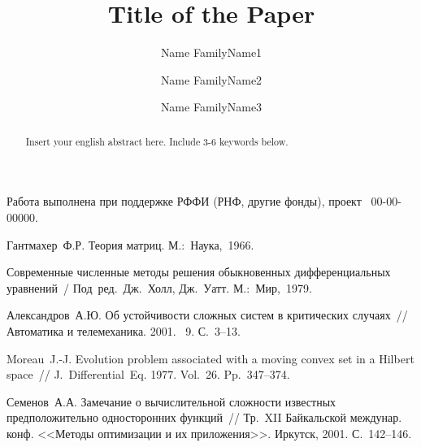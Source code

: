 \documentclass[12pt]{llncs}  %
\begin{document}

Работа выполнена при поддержке РФФИ (РНФ, другие фонды), проект \textnumero~00-00-00000.
%

%

\begin{thebibliography}{9} %
 Гантмахер~Ф.Р. Теория матриц. М.:~Наука,~1966.

 Современные численные методы решения обыкновенных дифференциальных уравнений~/ Под~ред.~Дж.~Холл, Дж.~Уатт. М.:~Мир,~1979.

 Александров~А.Ю. Об устойчивости сложных систем в критических случаях~// Автоматика и телемеханика. 2001. \textnumero~9. С.~3--13.

 Moreau~J.-J. Evolution problem associated with a moving convex set in a Hilbert space~// J.~Differential~Eq. 1977. Vol.~26. Pp.~347--374.

 Семенов~А.А. Замечание о вычислительной сложности известных предположительно односторонних функций~// Тр.~XII Байкальской междунар. конф. <<Методы оптимизации и их приложения>>. Иркутск, 2001. С.~142--146.

\end{thebibliography}


\begin{englishtitle} %
\title{Title of the Paper}
\author{Name FamilyName1
  \and
  Name FamilyName2
  \and
  Name FamilyName3
}

\maketitle

\begin{abstract}
Insert your english abstract here. Include 3-6 keywords below.

\end{abstract}
\end{englishtitle}
\end{document}
